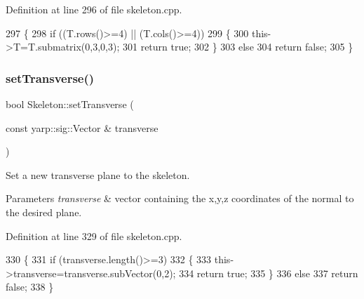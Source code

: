 Definition at line 296 of file skeleton.\+cpp.


\begin{DoxyCode}
297 \{
298     \textcolor{keywordflow}{if} ((T.rows()>=4) || (T.cols()>=4))
299     \{
300         this->T=T.submatrix(0,3,0,3);
301         \textcolor{keywordflow}{return} \textcolor{keyword}{true};
302     \}
303     \textcolor{keywordflow}{else}
304         \textcolor{keywordflow}{return} \textcolor{keyword}{false};
305 \}
\end{DoxyCode}
\mbox{\label{classassistive__rehab_1_1Skeleton_a1aeba05a17363afc08c30397d17375df}} 
\subsubsection{\texorpdfstring{set\+Transverse()}{setTransverse()}}
{\footnotesize\ttfamily bool Skeleton\+::set\+Transverse (\begin{DoxyParamCaption}\item[{const yarp\+::sig\+::\+Vector \&}]{transverse }\end{DoxyParamCaption})\hspace{0.3cm}{\ttfamily [inherited]}}



Set a new transverse plane to the skeleton. 


\begin{DoxyParams}{Parameters}
{\em transverse} & vector containing the x,y,z coordinates of the normal to the desired plane. \\
\hline
\end{DoxyParams}


Definition at line 329 of file skeleton.\+cpp.


\begin{DoxyCode}
330 \{
331     \textcolor{keywordflow}{if} (transverse.length()>=3)
332     \{
333         this->transverse=transverse.subVector(0,2);
334         \textcolor{keywordflow}{return} \textcolor{keyword}{true};
335     \}
336     \textcolor{keywordflow}{else}
337         \textcolor{keywordflow}{return} \textcolor{keyword}{false};
338 \}
\end{DoxyCode}
\mbox{\label{classassistive__rehab_1_1Skeleton_ad58ea53a165abc3f39a3c46594f0560f}} 

